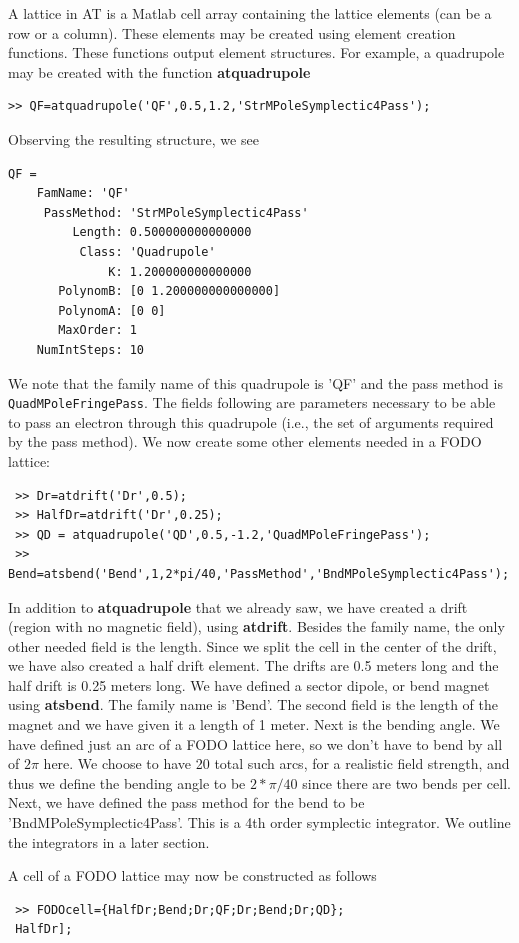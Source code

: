 \documentclass[acus]{article}
\newcommand{\mfun}[1]{{\bf{#1}}}
\newcommand{\passmethod}[1]{{\texttt{#1}}}
\begin{document}
A lattice in AT is a Matlab cell array containing the lattice elements (can be a row or a column).
These elements may be created using element creation functions.  These functions output element structures.  For example, a quadrupole may be created with the function \mfun{atquadrupole}
\begin{verbatim}
>> QF=atquadrupole('QF',0.5,1.2,'StrMPoleSymplectic4Pass');
\end{verbatim}
Observing the resulting structure, we see
\begin{verbatim}
QF = 
    FamName: 'QF'
     PassMethod: 'StrMPoleSymplectic4Pass'
         Length: 0.500000000000000
          Class: 'Quadrupole'
              K: 1.200000000000000
       PolynomB: [0 1.200000000000000]
       PolynomA: [0 0]
       MaxOrder: 1
    NumIntSteps: 10
\end{verbatim}
We note that the family name of this quadrupole is 'QF' and the pass method is \passmethod{QuadMPoleFringePass}.  The fields following are 
parameters necessary to be able to pass an electron through this quadrupole (i.e., the set of arguments required by the pass
 method).  We now create some other elements needed in a FODO lattice:
 \begin{verbatim}
 >> Dr=atdrift('Dr',0.5);
 >> HalfDr=atdrift('Dr',0.25);
 >> QD = atquadrupole('QD',0.5,-1.2,'QuadMPoleFringePass');
 >> Bend=atsbend('Bend',1,2*pi/40,'PassMethod','BndMPoleSymplectic4Pass');
 \end{verbatim}
In addition to \mfun{atquadrupole} that we already saw, we have created a drift (region with no 
magnetic field), using \mfun{atdrift}.  Besides the family name, the only other needed field is the
length.  Since we split the cell in the center of the drift, we have also created a half drift
element.  The drifts are 0.5 meters long and the half drift is 0.25 meters long.
We have defined a sector dipole, or bend magnet using \mfun{atsbend}.  The family name is 'Bend'.  The
second field is the length of the magnet and we have given it a length of 1 meter.  Next is the bending
angle.  We have defined just an arc of a FODO lattice here, so we don't have to bend by all of $2\pi$
here.  We choose to have 20 total such arcs, for a realistic field strength, and thus we define the
bending angle to be $2*\pi/40$ since there are two bends per cell.  Next, we have defined the pass
method for the bend to be 'BndMPoleSymplectic4Pass'.  This is a 4th order symplectic integrator. 
We outline the integrators in a later section.  

A cell of a FODO lattice may now be constructed as follows
 \begin{verbatim}
 >> FODOcell={HalfDr;Bend;Dr;QF;Dr;Bend;Dr;QD};
 HalfDr];
 \end{verbatim}
\end{document}
